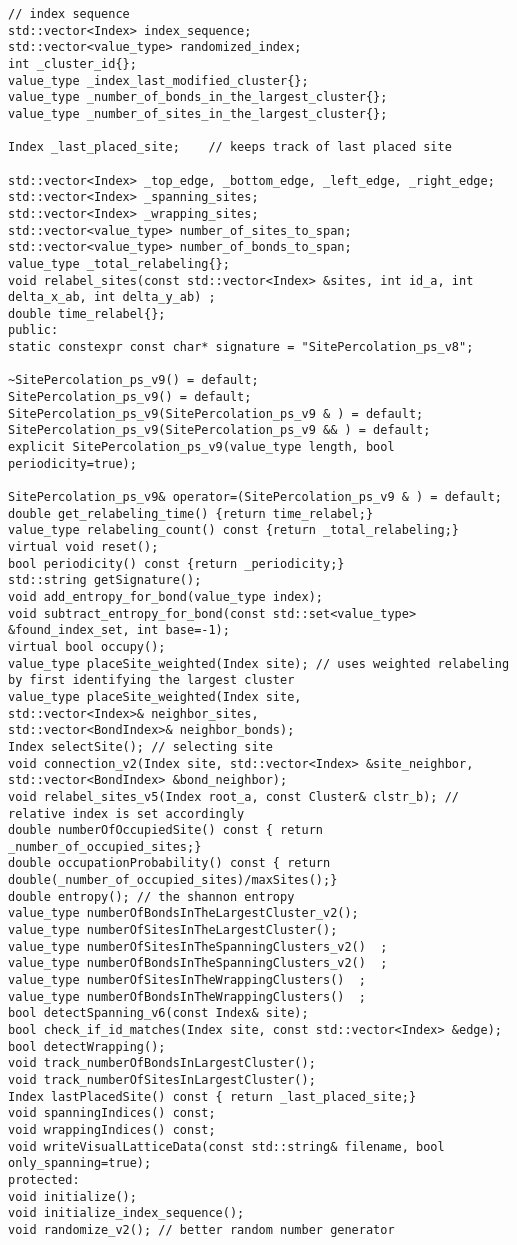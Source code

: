 \begin{lstlisting}[style=CStyle]
// index sequence
std::vector<Index> index_sequence;  
std::vector<value_type> randomized_index;
int _cluster_id{};
value_type _index_last_modified_cluster{}; 
value_type _number_of_bonds_in_the_largest_cluster{};
value_type _number_of_sites_in_the_largest_cluster{};   

Index _last_placed_site;    // keeps track of last placed site

std::vector<Index> _top_edge, _bottom_edge, _left_edge, _right_edge;
std::vector<Index> _spanning_sites;
std::vector<Index> _wrapping_sites;
std::vector<value_type> number_of_sites_to_span;
std::vector<value_type> number_of_bonds_to_span;
value_type _total_relabeling{};
void relabel_sites(const std::vector<Index> &sites, int id_a, int delta_x_ab, int delta_y_ab) ;
double time_relabel{};
public:
static constexpr const char* signature = "SitePercolation_ps_v8";

~SitePercolation_ps_v9() = default;
SitePercolation_ps_v9() = default;
SitePercolation_ps_v9(SitePercolation_ps_v9 & ) = default;
SitePercolation_ps_v9(SitePercolation_ps_v9 && ) = default;
explicit SitePercolation_ps_v9(value_type length, bool periodicity=true);

SitePercolation_ps_v9& operator=(SitePercolation_ps_v9 & ) = default;
double get_relabeling_time() {return time_relabel;}
value_type relabeling_count() const {return _total_relabeling;}
virtual void reset();
bool periodicity() const {return _periodicity;}
std::string getSignature();
void add_entropy_for_bond(value_type index);
void subtract_entropy_for_bond(const std::set<value_type> &found_index_set, int base=-1);
virtual bool occupy();
value_type placeSite_weighted(Index site); // uses weighted relabeling by first identifying the largest cluster
value_type placeSite_weighted(Index site,
std::vector<Index>& neighbor_sites,
std::vector<BondIndex>& neighbor_bonds);
Index selectSite(); // selecting site
void connection_v2(Index site, std::vector<Index> &site_neighbor, std::vector<BondIndex> &bond_neighbor);
void relabel_sites_v5(Index root_a, const Cluster& clstr_b); // relative index is set accordingly
double numberOfOccupiedSite() const { return _number_of_occupied_sites;}
double occupationProbability() const { return double(_number_of_occupied_sites)/maxSites();}
double entropy(); // the shannon entropy
value_type numberOfBondsInTheLargestCluster_v2();
value_type numberOfSitesInTheLargestCluster();
value_type numberOfSitesInTheSpanningClusters_v2()  ;
value_type numberOfBondsInTheSpanningClusters_v2()  ;
value_type numberOfSitesInTheWrappingClusters()  ;
value_type numberOfBondsInTheWrappingClusters()  ;
bool detectSpanning_v6(const Index& site);
bool check_if_id_matches(Index site, const std::vector<Index> &edge);
bool detectWrapping();
void track_numberOfBondsInLargestCluster();
void track_numberOfSitesInLargestCluster();
Index lastPlacedSite() const { return _last_placed_site;}
void spanningIndices() const;
void wrappingIndices() const;
void writeVisualLatticeData(const std::string& filename, bool only_spanning=true);
protected:
void initialize();
void initialize_index_sequence();
void randomize_v2(); // better random number generator


\end{lstlisting}
